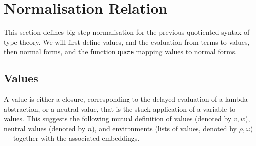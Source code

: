 \documentclass[a4paper,english]{lipics-v2019}
\newcommand{\agdaSymb}[1]{\mathsf{#1}}
\newcommand{\q}{\agdaSymb{quote}}
\begin{document}
\section{Normalisation Relation}
\label{sec:normalisation}
This section defines big step normalisation for the previous quotiented syntax
of type theory. We will first define values, and the evaluation from terms to
values, then normal forms, and the function $\q$ mapping values to normal
forms.

\subsection{Values}
A value is either a closure, corresponding to the delayed evaluation of a
lambda-abstraction, or a neutral value, that is the stuck application of a
variable to values. This suggests the following mutual definition of values
(denoted by $v,w$), neutral values (denoted by $n$), and environments (lists of
values, denoted by $\rho,\omega$) --- together with the associated embeddings.
\end{document}
